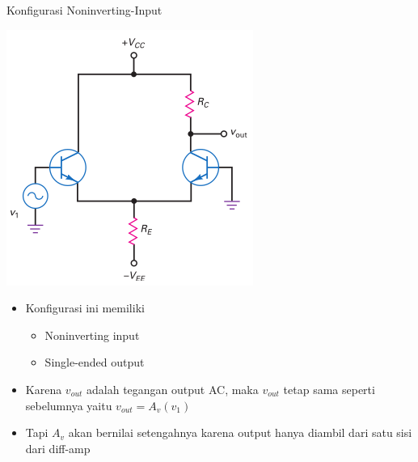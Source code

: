 \documentclass[aspectratio=169]{beamer}
\begin{document}
\begin{frame}{Konfigurasi Noninverting-Input}
	\begin{multicols}{2}
		\begin{center}
			\includegraphics[height=0.7\textheight]{gambar/01.noninverting_input+single-ended_output}
		\end{center}
		\columnbreak
		\begin{itemize}
			\item Konfigurasi ini memiliki
			\begin{itemize}
				\item Noninverting input
				\item Single-ended output
			\end{itemize}
			\item Karena $ v_{out} $ adalah tegangan output AC, maka $ v_{out} $ tetap sama seperti sebelumnya yaitu $ v_{out} = A_v (v_1) $
		\end{itemize}
		\begin{itemize}
			\item Tapi $ A_v $ akan bernilai setengahnya karena output hanya diambil dari satu sisi dari diff-amp
		\end{itemize}
	\end{multicols}
\end{frame}
\end{document}
